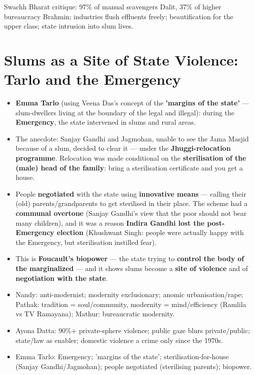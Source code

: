 \begin{QuickRevision}
Swachh Bharat critique: 97\% of manual scavengers Dalit, 37\% of higher bureaucracy Brahmin; industries flush effluents freely; beautification for the upper class; state intrusion into slum lives.
\end{QuickRevision}

\section{Slums as a Site of State Violence: Tarlo and the Emergency}

\begin{KeyConcept}
\begin{itemize}
\item \textbf{Emma Tarlo} (using Veena Das's concept of the \textbf{'margins of the state'} --- slum-dwellers living at the boundary of the legal and illegal): during the \textbf{Emergency}, the state intervened in slums and rural areas.
\item The anecdote: Sanjay Gandhi and Jagmohan, unable to see the Jama Masjid because of a slum, decided to clear it --- under the \textbf{Jhuggi-relocation programme}. Relocation was made conditional on the \textbf{sterilisation of the (male) head of the family}: bring a sterilisation certificate and you get a house.
\item People \textbf{negotiated} with the state using \textbf{innovative means} --- calling their (old) parents/grandparents to get sterilised in their place. The scheme had a \textbf{communal overtone} (Sanjay Gandhi's view that the poor should not bear many children), and it was a reason \textbf{Indira Gandhi lost the post-Emergency election} (Khushwant Singh: people were actually happy with the Emergency, but sterilisation instilled fear).
\item This is \textbf{Foucault's biopower} --- the state trying to \textbf{control the body of the marginalized} --- and it shows slums become a \textbf{site of violence} and of \textbf{negotiation with the state}.
\end{itemize}
\end{KeyConcept}

\begin{QuickRevision}
\begin{itemize}
\item Nandy: anti-modernist; modernity exclusionary; anomic urbanisation/rape; Pathak: tradition = soul/community, modernity = mind/efficiency (Ramlila vs TV Ramayana); Mathur: bureaucratic modernity.
\item Ayona Datta: 90\%+ private-sphere violence; public gaze blurs private/public; state/law as enabler; domestic violence a crime only since the 1970s.
\item Emma Tarlo: Emergency; 'margins of the state'; sterilisation-for-house (Sanjay Gandhi/Jagmohan); people negotiated (sterilising parents); biopower.
\end{itemize}
\end{QuickRevision}

